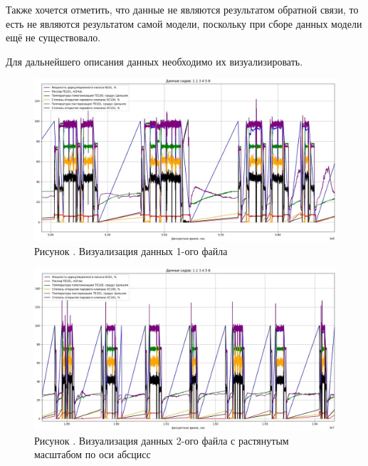{  \par \redline Также хочется отметить, что данные не являются результатом обратной связи, то есть не являются результатом самой модели, поскольку при сборе данных модели ещё не существовало.

  \par \redline Для дальнейшего описания данных необходимо их визуализировать. 

  \begin{figure}
    \centering
    \def\svgwidth{\textwidth}
    \includegraphics[scale=0.6]{images/data_1_visual.jpg}
    \caption*{\gostFont Рисунок \thechaptercntr .\theimagecntr \spc {--} Визуализация данных 1-ого файла}
    \label{fig:Data1Visual}
  \end{figure} \addtocounter{imagecntr}{1}

  \begin{figure}
    \centering
    \def\svgwidth{\textwidth}
    \includegraphics[scale=0.6]{images/data_2_visual.jpg}
    \caption*{\gostFont Рисунок \thechaptercntr .\theimagecntr \spc {--} Визуализация данных 2-ого файла с растянутым масштабом по оси абсцисс}
    \label{fig:Data2Visual}
  \end{figure} \addtocounter{imagecntr}{1}

}

